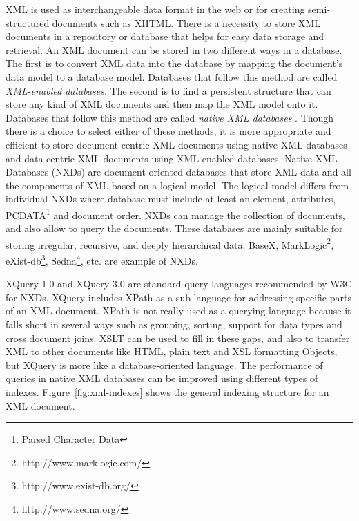 \documentclass[a4paper,12pt]{book}
\begin{document}
  XML is used as interchangeable data format in the web or for creating semi-structured documents such as XHTML. There is a necessity to store XML documents in a repository or database that helps for easy data storage and retrieval. An XML document can be stored in two different ways in a database. The first is to convert XML data into the database by mapping the document's data model to a database model. Databases that follow this method are called \textit{XML-enabled databases}. The second is to find a persistent structure that can store any kind of XML documents and then map the XML model onto it. Databases that follow this method are called \textit{native XML databases} \cite{pavlovic2007native}. Though there is a choice to select either of these methods, it is more appropriate and efficient to store document-centric XML documents using native XML databases and data-centric XML documents using XML-enabled databases. Native XML Databases (NXDs) are document-oriented databases that store XML data and all the components of XML based on a logical model. The logical model differs from individual NXDs where database must include at least an element, attributes, PCDATA\footnote{Parsed Character Data} and document order. NXDs can manage the collection of documents, and also allow to query the documents. These databases are mainly suitable for storing irregular, recursive, and deeply hierarchical data.  BaseX, MarkLogic\footnote{http://www.marklogic.com/}, eXist-db\footnote{http://www.exist-db.org/}, Sedna\footnote{http://www.sedna.org/}, etc. are example of NXDs. 
 \par 
 XQuery 1.0 and XQuery 3.0 are standard query languages recommended by W3C for NXDs. XQuery includes XPath as a sub-language for addressing specific parts of an XML document. XPath is not really used as a querying language because it falls short in several ways such as grouping, sorting, support for data types and cross document joins. XSLT can be used to fill in these gaps, and also to transfer XML to other documents like HTML, plain text and XSL formatting Objects, but XQuery is more like a database-oriented language.  The performance of queries in native XML databases can be improved using different types of indexes. Figure~\ref{fig:xml-indexes} shows the general indexing structure for an XML document. 
\end{document}
